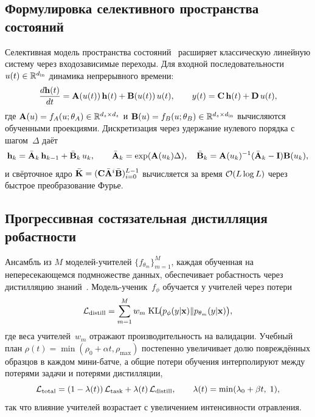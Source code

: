 \subsection{Формулировка селективного пространства состояний}

Селективная модель пространства состояний~\cite{Gu2022,Gu2024} расширяет классическую линейную систему через входозависимые переходы. Для входной последовательности $u(t)\in\mathbb{R}^{d_{\mathrm{in}}}$ динамика непрерывного времени:
\begin{equation}
\frac{d\mathbf{h}(t)}{dt} = \mathbf{A}(u(t))\,\mathbf{h}(t) + \mathbf{B}(u(t))\,u(t),
\qquad
y(t) = \mathbf{C}\,\mathbf{h}(t) + \mathbf{D}\,u(t),
\label{eq:mamba_cts}
\end{equation}
где $\mathbf{A}(u)=f_A(u;\theta_A)\in\mathbb{R}^{d_s\times d_s}$ и $\mathbf{B}(u)=f_B(u;\theta_B)\in\mathbb{R}^{d_s\times d_{\mathrm{in}}}$ вычисляются обученными проекциями. Дискретизация через удержание нулевого порядка с шагом~$\Delta$ даёт
\begin{equation}
\mathbf{h}_k = \bar{\mathbf{A}}_k\,\mathbf{h}_{k-1} + \bar{\mathbf{B}}_k\,u_k,
\qquad
\bar{\mathbf{A}}_k = \exp(\mathbf{A}(u_k)\Delta),
\quad
\bar{\mathbf{B}}_k = \mathbf{A}(u_k)^{-1}(\bar{\mathbf{A}}_k - \mathbf{I})\mathbf{B}(u_k),
\label{eq:mamba_disc}
\end{equation}
и свёрточное ядро $\bar{\mathbf{K}}=(\mathbf{C}\bar{\mathbf{A}}^i\bar{\mathbf{B}})_{i=0}^{L-1}$ вычисляется за время $\mathcal{O}(L\log L)$ через быстрое преобразование Фурье.

\subsection{Прогрессивная состязательная дистилляция робастности}

Ансамбль из $M$ моделей-учителей $\{f_{\theta_m}\}_{m=1}^M$, каждая обученная на непересекающемся подмножестве данных, обеспечивает робастность через дистилляцию знаний~\cite{Hinton2015,Xie2019}. Модель-ученик~$f_\phi$ обучается у учителей через потери
\begin{equation}
\mathcal{L}_{\mathrm{distill}}
= \sum_{m=1}^{M}w_m\;\mathrm{KL}\!\bigl(p_\phi(y|\mathbf{x})\|p_{\theta_m}(y|\mathbf{x})\bigr),
\label{eq:mamba_distill}
\end{equation}
где веса учителей~$w_m$ отражают производительность на валидации. Учебный план $\rho(t)=\min(\rho_0+\alpha t,\rho_{\max})$ постепенно увеличивает долю повреждённых образцов в каждом мини-батче, а общие потери обучения интерполируют между потерями задачи и потерями дистилляции,
\begin{equation}
\mathcal{L}_{\mathrm{total}}
= (1-\lambda(t))\,\mathcal{L}_{\mathrm{task}}
+ \lambda(t)\,\mathcal{L}_{\mathrm{distill}},
\qquad
\lambda(t) = \min(\lambda_0+\beta t,\;1),
\label{eq:mamba_curriculum}
\end{equation}
так что влияние учителей возрастает с увеличением интенсивности отравления.

